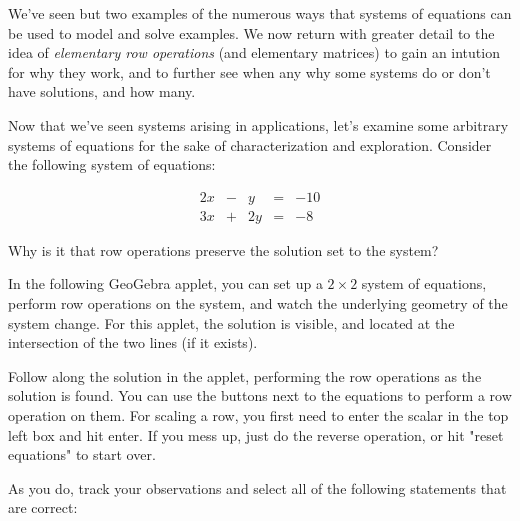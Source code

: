 \documentclass{ximera}
\begin{document}
\begin{exploration}

  We've seen but two examples of the numerous ways that systems of equations can be used to model and solve examples. We now return with greater detail to the idea of \emph{elementary row operations} (and elementary matrices) to gain an intution for why they work, and to further see when any why some systems do or don't have solutions, and how many.

  \begin{example}

    Now that we've seen systems arising in applications, let's examine some arbitrary systems of equations for the sake of characterization and exploration. Consider the following system of equations:
 
    $$\begin{matrix}
      2x& -&y&=&-10\\
      3x & +&2y&= &-8
    \end{matrix}$$

    Why is it that row operations preserve the solution set to the system?

    In the following GeoGebra applet, you can set up a $2\times 2$ system of equations, perform row operations on the system, and watch the underlying geometry of the system change. For this applet, the solution is visible, and located at the intersection of the two lines (if it exists).

    \begin{center}
    \end{center}

    Follow along the solution in the applet, performing the row operations as the solution is found. You can use the buttons next to the equations to perform a row operation on them. For scaling a row, you first need to enter the scalar in the top left box and hit enter. If you mess up, just do the reverse operation, or hit "reset equations" to start over.
    
    As you do, track your observations and select all of the following statements that are correct:

    \begin{selectAll}
  \end{selectAll}
     

\end{example}
\end{exploration}
\end{document}

